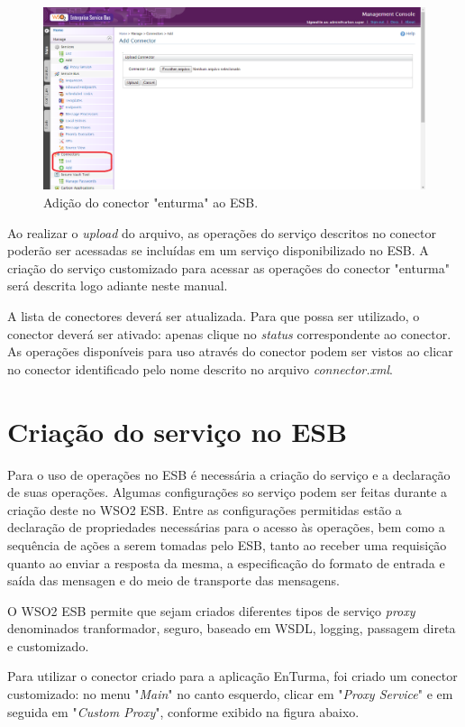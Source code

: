 \begin{figure}[htb]
\centering
\includegraphics[width=1.0\textwidth]{figuras/add_connector.PNG}
\caption{Adição do conector "enturma" ao ESB.}
\label{add_connector}
\end{figure}

Ao realizar o \textit{upload} do arquivo, as operações do serviço descritos no conector poderão ser acessadas se incluídas em um serviço disponibilizado no ESB. A criação do serviço customizado para acessar as operações do conector "enturma" será descrita logo adiante neste manual.

A lista de conectores deverá ser atualizada. Para que possa ser utilizado, o conector deverá ser ativado: apenas clique no \textit{status} correspondente ao conector. As operações disponíveis para uso através do conector podem ser vistos ao clicar no conector identificado pelo nome descrito no arquivo \textit{connector.xml}.

\section{Criação do serviço no ESB}
Para o uso de operações no ESB é necessária a criação do serviço e a declaração de suas operações. Algumas configurações so serviço podem ser feitas durante a criação deste no WSO2 ESB. Entre as configurações permitidas estão a declaração de propriedades necessárias para o acesso às operações, bem como a sequência de ações a serem tomadas pelo ESB, tanto ao receber uma requisição quanto ao enviar a resposta da mesma, a especificação do formato de entrada e saída das mensagen e do meio de transporte das mensagens.

O WSO2 ESB permite que sejam criados diferentes tipos de serviço \textit{proxy} denominados tranformador, seguro, baseado em WSDL, logging, passagem direta e customizado.

Para utilizar o conector criado para a aplicação EnTurma, foi criado um conector customizado: no menu "\textit{Main}" no canto esquerdo, clicar em "\textit{Proxy Service}" e em seguida em "\textit{Custom Proxy}", conforme exibido na figura abaixo.

